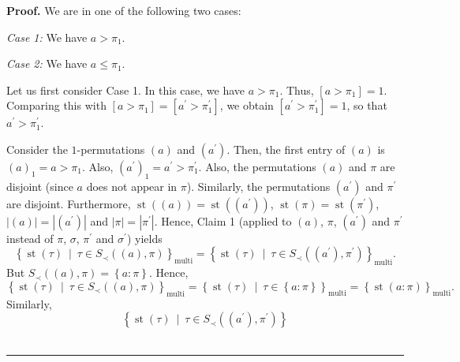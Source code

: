 \documentclass[numbers=enddot,12pt,final,onecolumn,notitlepage]{scrartcl}%
\theoremstyle{definition}
\newenvironment{proof}[1][Proof]{\noindent\textbf{#1.} }{\ \rule{0.5em}{0.5em}}
\newenvironment{verlong}{}{}
\begin{document}
\begin{verlong}
\begin{proof}
We are in one of the following two cases:

\textit{Case 1:} We have $a>\pi_{1}$.

\textit{Case 2:} We have $a\leq\pi_{1}$.

Let us first consider Case 1. In this case, we have $a>\pi_{1}$. Thus,
$\left[  a>\pi_{1}\right]  =1$. Comparing this with $\left[  a>\pi_{1}\right]
=\left[  a^{\prime}>\pi_{1}^{\prime}\right]  $, we obtain $\left[  a^{\prime
}>\pi_{1}^{\prime}\right]  =1$, so that $a^{\prime}>\pi_{1}^{\prime}$.

Consider the $1$-permutations $\left(  a\right)  $ and $\left(  a^{\prime
}\right)  $. Then, the first entry of $\left(  a\right)  $ is $\left(
a\right)  _{1}=a>\pi_{1}$. Also, $\left(  a^{\prime}\right)  _{1}=a^{\prime
}>\pi_{1}^{\prime}$. Also, the permutations $\left(  a\right)  $ and $\pi$ are
disjoint (since $a$ does not appear in $\pi$). Similarly, the permutations
$\left(  a^{\prime}\right)  $ and $\pi^{\prime}$ are disjoint. Furthermore,
$\operatorname*{st}\left(  \left(  a\right)  \right)  =\operatorname*{st}%
\left(  \left(  a^{\prime}\right)  \right)  $, $\operatorname*{st}\left(
\pi\right)  =\operatorname*{st}\left(  \pi^{\prime}\right)  $, $\left\vert
\left(  a\right)  \right\vert =\left\vert \left(  a^{\prime}\right)
\right\vert $ and $\left\vert \pi\right\vert =\left\vert \pi^{\prime
}\right\vert $. Hence, Claim 1 (applied to $\left(  a\right)  $, $\pi$,
$\left(  a^{\prime}\right)  $ and $\pi^{\prime}$ instead of $\pi$, $\sigma$,
$\pi^{\prime}$ and $\sigma^{\prime}$) yields%
\begin{equation}
\left\{  \operatorname*{st}\left(  \tau\right)  \ \mid\ \tau\in S_{\prec
}\left(  \left(  a\right)  ,\pi\right)  \right\}  _{\operatorname*{multi}%
}=\left\{  \operatorname*{st}\left(  \tau\right)  \ \mid\ \tau\in S_{\prec
}\left(  \left(  a^{\prime}\right)  ,\pi^{\prime}\right)  \right\}
_{\operatorname*{multi}}. \label{pf.prop.LRcomp.equivs.3to4.4}%
\end{equation}
But $S_{\prec}\left(  \left(  a\right)  ,\pi\right)  =\left\{  a:\pi\right\}
$. Hence,%
\[
\left\{  \operatorname*{st}\left(  \tau\right)  \ \mid\ \tau\in S_{\prec
}\left(  \left(  a\right)  ,\pi\right)  \right\}  _{\operatorname*{multi}%
}=\left\{  \operatorname*{st}\left(  \tau\right)  \ \mid\ \tau\in\left\{
a:\pi\right\}  \right\}  _{\operatorname*{multi}}=\left\{  \operatorname*{st}%
\left(  a:\pi\right)  \right\}  _{\operatorname*{multi}}.
\]
Similarly,%
\[
\left\{  \operatorname*{st}\left(  \tau\right)  \ \mid\ \tau\in S_{\prec
}\left(  \left(  a^{\prime}\right)  ,\pi^{\prime}\right)  \right\}
\]
\end{proof}
\end{verlong}
\end{document}
